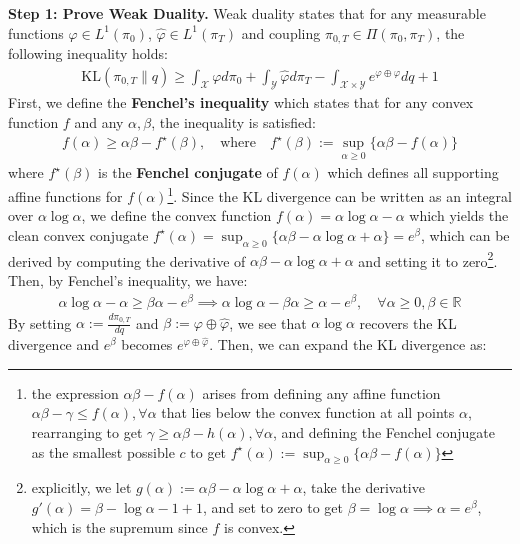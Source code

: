 \documentclass{article}
\begin{document}
\textbf{Step 1: Prove Weak Duality.} 
Weak duality states that for any measurable functions $\varphi\in L^1(\pi_0)$, $\hat{\varphi}\in L^1(\pi_T)$ and coupling $\pi_{0,T}\in \Pi(\pi_0, \pi_T)$, the following inequality holds:
\begin{align}
    \text{KL}(\pi_{0,T}\|q)\geq\int_{\mathcal{X}}\varphi d\pi_0+\int_{\mathcal{Y}}\hat{\varphi}d\pi_T-\int_{\mathcal{X}\times \mathcal{Y}}e^{\varphi\oplus\hat{\varphi}}dq+1\tag{Weak Duality}\label{eq:weak-duality}
\end{align}
First, we define the \textbf{Fenchel's inequality} which states that for any convex function $f$ and any $\alpha, \beta$, the inequality is satisfied:
\begin{align}
    f(\alpha)\geq \alpha \beta-f^\star(\beta), \quad\text{where}\quad f^\star(\beta):=\sup_{\alpha\geq 0}\{\alpha \beta-f(\alpha)\}
\end{align}
where $f^\star(\beta)$ is the \textbf{Fenchel conjugate} of $f(\alpha)$ which defines all supporting affine functions for $f(\alpha)$\footnote{the expression $\alpha \beta-f(\alpha)$ arises from defining any affine function $\alpha\beta-\gamma\leq f(\alpha), \forall \alpha$ that lies below the convex function at all points $\alpha$, rearranging to get $\gamma \geq \alpha \beta-h(\alpha), \forall \alpha$, and defining the Fenchel conjugate as the smallest possible $c$ to get $f^\star(\alpha):=\sup_{\alpha\geq 0}\{\alpha\beta-f(\alpha)\}$}. Since the KL divergence can be written as an integral over $\alpha\log \alpha$, we define the convex function $f(\alpha)=\alpha\log \alpha-\alpha$ which yields the clean convex conjugate $f^\star(\alpha)=\sup_{\alpha\geq 0}\{\alpha\beta-\alpha\log \alpha+\alpha\}=e^{\beta}$, which can be derived by computing the derivative of $\alpha\beta-\alpha\log \alpha+\alpha$ and setting it to zero\footnote{explicitly, we let $g(\alpha):=\alpha\beta-\alpha\log \alpha+\alpha$, take the derivative $g'(\alpha) =\beta-\log \alpha-1+1$, and set to zero to get $\beta=\log \alpha\implies \alpha=e^{\beta}$, which is the supremum since $f$ is convex.}. Then, by Fenchel's inequality, we have:
\begin{align}
    \alpha\log \alpha-\alpha\geq \beta\alpha-e^{\beta}\implies \alpha\log \alpha-\beta \alpha \geq \alpha-e^{\beta}, \quad \forall \alpha\geq 0, \beta \in \mathbb{R}
\end{align}
By setting $\alpha:=\frac{d\pi_{0,T}}{dq}$ and $\beta:=\varphi \oplus \hat{\varphi}$, we see that $\alpha\log \alpha$ recovers the KL divergence and $e^{\beta}$ becomes $e^{\varphi\oplus \hat{\varphi}}$. Then, we can expand the KL divergence as:
\end{document}
